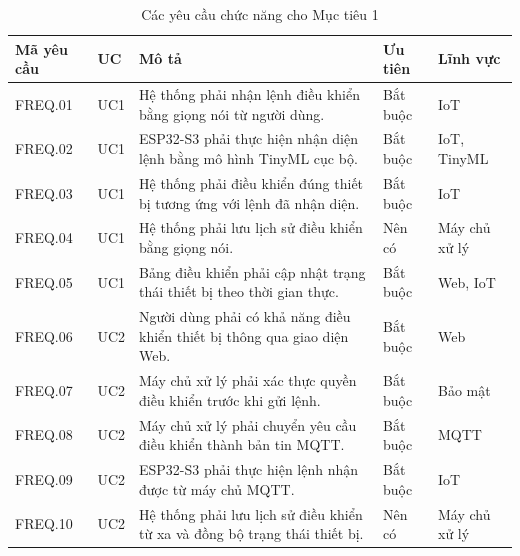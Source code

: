 \documentclass[a4paper,12pt]{article}
\begin{document}
\begin{table}[H]
\centering
\caption{Các yêu cầu chức năng cho Mục tiêu 1}
\small
\begin{tabularx}{\linewidth}{|p{1.8cm}|p{1.2cm}|X|p{2cm}|p{2.2cm}|}
\hline
\textbf{Mã yêu cầu} &
\textbf{UC} &
\textbf{Mô tả} &
\textbf{Ưu tiên} &
\textbf{Lĩnh vực} \\ %
\hline

FREQ.01 & UC1 &
Hệ thống phải nhận lệnh điều khiển bằng giọng nói từ người dùng. &
Bắt buộc &
IoT \\ %
\hline

FREQ.02 & UC1 &
ESP32-S3 phải thực hiện nhận diện lệnh bằng mô hình TinyML cục bộ. &
Bắt buộc &
IoT, TinyML \\ %
\hline

FREQ.03 & UC1 &
Hệ thống phải điều khiển đúng thiết bị tương ứng với lệnh đã nhận diện. &
Bắt buộc &
IoT \\ %
\hline

FREQ.04 & UC1 &
Hệ thống phải lưu lịch sử điều khiển bằng giọng nói. &
Nên có &
Máy chủ xử lý \\ %
\hline

FREQ.05 & UC1 &
Bảng điều khiển phải cập nhật trạng thái thiết bị theo thời gian thực. &
Bắt buộc &
Web, IoT \\ %
\hline

FREQ.06 & UC2 &
Người dùng phải có khả năng điều khiển thiết bị thông qua giao diện Web. &
Bắt buộc &
Web \\ %
\hline

FREQ.07 & UC2 &
Máy chủ xử lý phải xác thực quyền điều khiển trước khi gửi lệnh. &
Bắt buộc &
Bảo mật \\ %
\hline

FREQ.08 & UC2 &
Máy chủ xử lý phải chuyển yêu cầu điều khiển thành bản tin MQTT. &
Bắt buộc &
MQTT \\ %
\hline

FREQ.09 & UC2 &
ESP32-S3 phải thực hiện lệnh nhận được từ máy chủ MQTT. &
Bắt buộc &
IoT \\ %
\hline

FREQ.10 & UC2 &
Hệ thống phải lưu lịch sử điều khiển từ xa và đồng bộ trạng thái thiết bị. &
Nên có &
Máy chủ xử lý \\
\hline

\end{tabularx}
\end{table}
\end{document}
